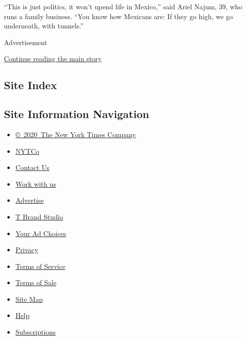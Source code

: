 ``This is just politics, it won't upend life in Mexico,'' said Ariel
Najum, 39, who runs a family business. ``You know how Mexicans are: If
they go high, we go underneath, with tunnels.''

Advertisement

\protect\hyperlink{after-bottom}{Continue reading the main story}

\hypertarget{site-index}{%
\subsection{Site Index}\label{site-index}}

\hypertarget{site-information-navigation}{%
\subsection{Site Information
Navigation}\label{site-information-navigation}}

\begin{itemize}
\tightlist
\item
  \href{https://help.nytimes3xbfgragh.onion/hc/en-us/articles/115014792127-Copyright-notice}{©~2020~The
  New York Times Company}
\end{itemize}

\begin{itemize}
\tightlist
\item
  \href{https://www.nytco.com/}{NYTCo}
\item
  \href{https://help.nytimes3xbfgragh.onion/hc/en-us/articles/115015385887-Contact-Us}{Contact
  Us}
\item
  \href{https://www.nytco.com/careers/}{Work with us}
\item
  \href{https://nytmediakit.com/}{Advertise}
\item
  \href{http://www.tbrandstudio.com/}{T Brand Studio}
\item
  \href{https://www.nytimes3xbfgragh.onion/privacy/cookie-policy\#how-do-i-manage-trackers}{Your
  Ad Choices}
\item
  \href{https://www.nytimes3xbfgragh.onion/privacy}{Privacy}
\item
  \href{https://help.nytimes3xbfgragh.onion/hc/en-us/articles/115014893428-Terms-of-service}{Terms
  of Service}
\item
  \href{https://help.nytimes3xbfgragh.onion/hc/en-us/articles/115014893968-Terms-of-sale}{Terms
  of Sale}
\item
  \href{https://spiderbites.nytimes3xbfgragh.onion}{Site Map}
\item
  \href{https://help.nytimes3xbfgragh.onion/hc/en-us}{Help}
\item
  \href{https://www.nytimes3xbfgragh.onion/subscription?campaignId=37WXW}{Subscriptions}
\end{itemize}
